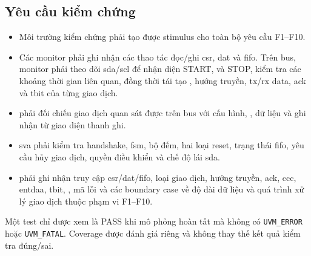 \subsection{Yêu cầu kiểm chứng}
\label{sec:req-verif}

\begin{itemize}
	\item Môi trường kiểm chứng phải tạo được stimulus cho toàn bộ yêu cầu F1--F10.
	\item Các monitor phải ghi nhận các thao tác đọc/ghi \gls{csr}, \gls{dat} và \gls{fifo}. Trên bus, monitor phải theo dõi \gls{sda}/\gls{scl} để nhận diện START, \RepeatedSTART{} và STOP, kiểm tra các khoảng thời gian liên quan, đồng thời tái tạo \AddressHeader{}, hướng truyền, \gls{tx}/\acrshort{rx} data, \gls{ack} và \gls{tbit} của từng giao dịch.
	\item \Scoreboard{} phải đối chiếu giao dịch quan sát được trên bus với cấu hình, \CommandDescriptor{}, dữ liệu và \ResponseDescriptor{} ghi nhận từ giao diện thanh ghi.
	\item \gls{sva} phải kiểm tra handshake, \gls{fsm}, bộ đếm, hai loại reset, trạng thái \gls{fifo}, yêu cầu hủy giao dịch, quyền điều khiển và chế độ lái \gls{sda}.
	\item \FunctionalCoverage{} phải ghi nhận truy cập \gls{csr}/\gls{dat}/\gls{fifo}, loại giao dịch, hướng truyền, \gls{ack}, \gls{ccc}, \gls{entdaa}, \gls{tbit}, \ResponseDescriptor{}, mã lỗi và các boundary case về độ dài dữ liệu và quá trình xử lý giao dịch thuộc phạm vi F1--F10.
\end{itemize}

Một test chỉ được xem là PASS khi mô phỏng hoàn tất mà không có \texttt{UVM\_ERROR} hoặc \texttt{UVM\_FATAL}. Coverage được đánh giá riêng và không thay thế kết quả kiểm tra đúng/sai.
